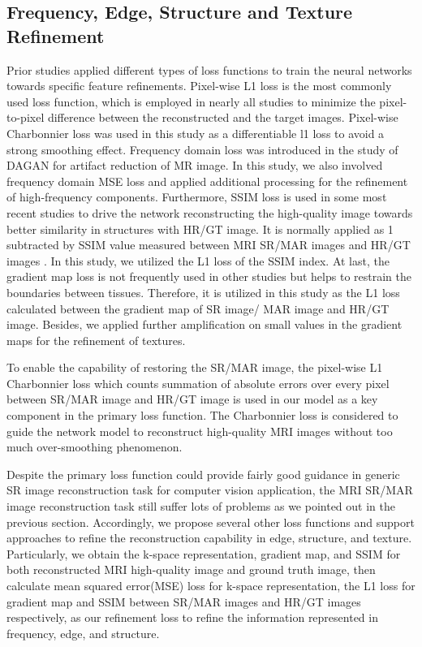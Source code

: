\documentclass[runningheads]{llncs}
\begin{document}
\subsection{Frequency, Edge, Structure and Texture Refinement}
Prior studies applied different types of loss functions to train the neural networks towards specific feature refinements. Pixel-wise L1 loss is the most commonly used loss function, which is employed in nearly all studies to minimize the pixel-to-pixel difference between the reconstructed and the target images. Pixel-wise Charbonnier loss was used in this study as a differentiable l1 loss to avoid a strong smoothing effect\cite{ref_charbo}. Frequency domain loss was introduced in the study of DAGAN for artifact reduction of MR image\cite{ref_kspace}. In this study, we also involved frequency domain MSE loss and applied additional processing for the refinement of high-frequency components. Furthermore, SSIM loss is used in some most recent studies to drive the network reconstructing the high-quality image towards better similarity in structures with HR/GT image. It is normally applied as 1 subtracted by SSIM value measured between MRI SR/MAR images and HR/GT images \cite{ref_cardio_app}. In this study, we utilized the L1 loss of the SSIM index. At last, the gradient map loss is not frequently used in other studies but helps to restrain the boundaries between tissues. Therefore, it is utilized in this study as the L1 loss calculated between the gradient map of SR image/ MAR image and HR/GT image. Besides, we applied further amplification on small values in the gradient maps for the refinement of textures.

To enable the capability of restoring the SR/MAR image, the pixel-wise L1 Charbonnier loss which counts summation of absolute errors over every pixel between SR/MAR image and HR/GT image is used in our model as a key component in the primary loss function. The Charbonnier loss is considered to guide the network model to reconstruct high-quality MRI images without too much over-smoothing phenomenon. 

Despite the primary loss function could provide fairly good guidance in generic SR image reconstruction task for computer vision application, the MRI SR/MAR image reconstruction task still suffer lots of problems as we pointed out in the previous section. Accordingly, we propose several other loss functions and support approaches to refine the reconstruction capability in edge, structure, and texture. Particularly, we obtain the k-space representation, gradient map, and SSIM for both reconstructed MRI high-quality image and ground truth image, then calculate mean squared error(MSE) loss for k-space representation, the L1 loss for gradient map and SSIM between SR/MAR images and HR/GT images respectively, as our refinement loss to refine the information represented in frequency, edge, and structure.
\end{document}
